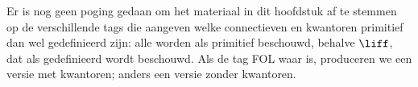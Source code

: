 \documentclass[openany]{memoir}
\begin{document}
\begingroup
\def\olfilename{OLP-0112}
\def\olfilepath{content/first-order-logic/axiomatic-deduction/}
\hypertarget{unit-OLP-0112}{}



      {}
      {}

\begin{editorial}
  Er is nog geen poging gedaan om het materiaal in dit hoofdstuk af te
  stemmen op de verschillende tags die aangeven welke connectieven en
  kwantoren primitief dan wel gedefinieerd zijn: alle worden als
  primitief beschouwd, behalve $\liff$, dat als gedefinieerd wordt
  beschouwd. Als de tag FOL waar is, produceren we een versie met
  kwantoren; anders een versie zonder kwantoren.
\end{editorial}













\endgroup

\begingroup
\def\olfilename{OLP-0113}
\def\olfilepath{content/first-order-logic/axiomatic-deduction/}
\hypertarget{unit-OLP-0113}{}



      {}
      {}
\end{document}
